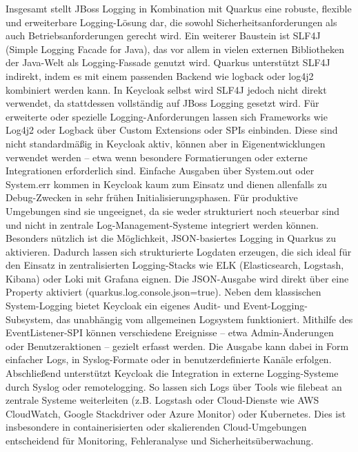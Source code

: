 \documentclass[a4paper,12pt]{article}
\begin{document}
	Insgesamt stellt JBoss Logging in Kombination mit Quarkus eine robuste, flexible und erweiterbare Logging-Lösung dar, die sowohl Sicherheitsanforderungen als auch Betriebsanforderungen gerecht wird.
	Ein weiterer Baustein ist SLF4J (Simple Logging Facade for Java), das vor allem in vielen externen Bibliotheken der Java-Welt als Logging-Fassade genutzt wird. Quarkus unterstützt SLF4J indirekt, indem es mit einem passenden Backend wie logback oder log4j2 kombiniert werden kann. In Keycloak selbst wird SLF4J jedoch nicht direkt verwendet, da stattdessen vollständig auf JBoss Logging gesetzt wird.
	\vspace{0.5em}
	Für erweiterte oder spezielle Logging-Anforderungen lassen sich Frameworks wie Log4j2 oder Logback über Custom Extensions oder SPIs einbinden. Diese sind nicht standardmäßig in Keycloak aktiv, können aber in Eigenentwicklungen verwendet werden – etwa wenn besondere Formatierungen oder externe Integrationen erforderlich sind.
	\vspace{0.5em}
	Einfache Ausgaben über System.out oder System.err kommen in Keycloak kaum zum Einsatz und dienen allenfalls zu Debug-Zwecken in sehr frühen Initialisierungsphasen. Für produktive Umgebungen sind sie ungeeignet, da sie weder strukturiert noch steuerbar sind und nicht in zentrale Log-Management-Systeme integriert werden können.
	\vspace{0.5em}
	Besonders nützlich ist die Möglichkeit, JSON-basiertes Logging in Quarkus zu aktivieren. Dadurch lassen sich strukturierte Logdaten erzeugen, die sich ideal für den Einsatz in zentralisierten Logging-Stacks wie ELK (Elasticsearch, Logstash, Kibana) oder Loki mit Grafana eignen. Die JSON-Ausgabe wird direkt über eine Property aktiviert (quarkus.log.console.json=true).
	\vspace{0.5em}
	Neben dem klassischen System-Logging bietet Keycloak ein eigenes Audit- und Event-Logging-Subsystem, das unabhängig vom allgemeinen Logsystem funktioniert. Mithilfe des EventListener-SPI können verschiedene Ereignisse – etwa Admin-Änderungen oder Benutzeraktionen – gezielt erfasst werden. Die Ausgabe kann dabei in Form einfacher Logs, in Syslog-Formate oder in benutzerdefinierte Kanäle erfolgen.
	\vspace{0.5em}
	Abschließend unterstützt Keycloak die Integration in externe Logging-Systeme durch Syslog oder \gls{remotelogging}. So lassen sich Logs über Tools wie \gls{filebeat} an zentrale Systeme weiterleiten (z.B. Logstash oder Cloud-Dienste wie AWS CloudWatch, Google Stackdriver oder Azure Monitor) oder Kubernetes. Dies ist insbesondere in containerisierten oder skalierenden Cloud-Umgebungen entscheidend für Monitoring, Fehleranalyse und Sicherheitsüberwachung.
	
\end{document}
